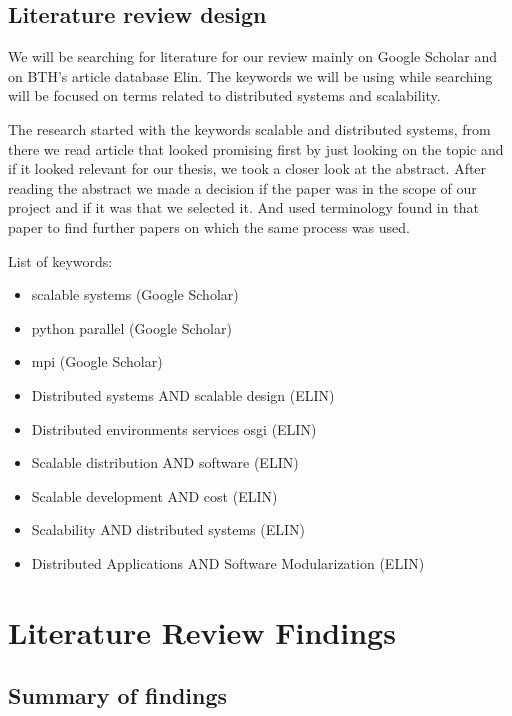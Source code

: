 \documentclass{article}
\begin{document}
\subsection{Literature review design}

We will be searching for literature for our review mainly on Google Scholar and
on BTH's article database Elin. The keywords we will be using while searching 
will be focused on terms related to distributed systems and scalability.

The research started with the keywords scalable and distributed systems,
from there we read article that looked promising first by just looking on
the topic and if it looked relevant for our thesis, we took a closer look
at the abstract. After reading the abstract we made a decision if the paper
was in the scope of our project and if it was that we selected it. And used
terminology found in that paper to find further papers on which the same 
process was used. 
\newline

List of keywords:
\begin{itemize}
\item{scalable systems (Google Scholar)}
\item{python parallel (Google Scholar)}
\item{mpi (Google Scholar)}
\item{Distributed systems AND scalable design (ELIN)}
\item{Distributed environments services osgi (ELIN)}
\item{Scalable distribution AND software (ELIN)}
\item{Scalable development AND cost (ELIN)}
\item{Scalability AND distributed systems (ELIN)}
\item{Distributed Applications AND Software Modularization (ELIN)}
\end{itemize}

\section{Literature Review Findings}

\subsection{Summary of findings}
\end{document}
